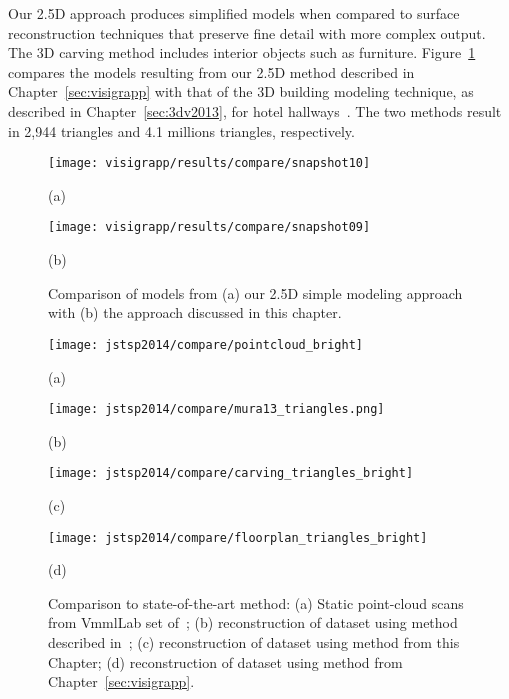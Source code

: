 \documentclass[12pt,onecolumn,oneside]{book}
\begin{document}
Our 2.5D approach produces simplified models when compared to surface reconstruction techniques that preserve fine detail with more complex output.  The 3D carving method includes interior objects such as furniture.  Figure~\ref{fig:visigrapp_compare_to_carving} compares the models resulting from our 2.5D method described in Chapter~\ref{sec:visigrapp} with that of the 3D building modeling technique, as described in Chapter~\ref{sec:3dv2013}, for hotel hallways~\cite{Turner13,Turner14}.  The two methods result in 2,944 triangles and 4.1 millions triangles, respectively.

\begin{figure}
   \centering
   \begin{minipage}[b]{0.49\linewidth}
   \texttt{[image: visigrapp/results/compare/snapshot10]}
   \centerline{(a)}
   \end{minipage}
   \hfill
   \begin{minipage}[b]{0.49\linewidth}
   \texttt{[image: visigrapp/results/compare/snapshot09]}
   \centerline{(b)}
   \end{minipage}
   \caption[Comparison of 2.5D simple model with a 3D carved model.]{Comparison of models from (a) our 2.5D simple modeling approach with (b) the approach discussed in this chapter.}
   \label{fig:visigrapp_compare_to_carving}
\end{figure}

\begin{figure}[t]

	\begin{minipage}[b]{0.58\linewidth}
		\centerline{\texttt{[image: jstsp2014/compare/pointcloud\_bright]}}
		\centerline{(a)}\medskip
	\end{minipage}
	\hfill
	\begin{minipage}[b]{0.4\linewidth}
		\centerline{\texttt{[image: jstsp2014/compare/mura13\_triangles.png]}}
		\centerline{(b)}\medskip
	\end{minipage}
	\hfill
	\begin{minipage}[b]{0.58\linewidth}
		\centerline{\texttt{[image: jstsp2014/compare/carving\_triangles\_bright]}}
		\centerline{(c)}\medskip
	\end{minipage}
	\hfill
	\begin{minipage}[b]{0.4\linewidth}
		\centerline{\texttt{[image: jstsp2014/compare/floorplan\_triangles\_bright]}}
		\centerline{(d)}\medskip
	\end{minipage}

	\caption[Comparison of models to existing approach.]{Comparison to state-of-the-art method: (a) Static point-cloud scans from VmmlLab set of~\cite{Mattausch14}; (b) reconstruction of dataset using method described in~\cite{Mura13}; (c) reconstruction of dataset using method from this Chapter; (d) reconstruction of dataset using method from Chapter~\ref{sec:visigrapp}.}
	\label{fig:stateofartcompare}

\end{figure}
\end{document}
